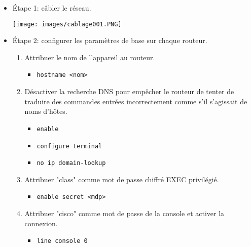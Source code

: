 \documentclass[a4paper]{article}
\begin{document}
\begin{itemize}





\item Étape 1: câbler le réseau.
\begin{center}
    \texttt{[image: images/cablage001.PNG]}
\end{center}





\item Étape 2: configurer les paramètres de base sur chaque routeur.
\begin{enumerate}
    \item Attribuer le nom de l'appareil au routeur.
    \begin{example}
        \begin{itemize}
            \item \texttt{hostname <nom>}
        \end{itemize}
    \end{example}
    \item Désactiver la recherche DNS pour empêcher le routeur de tenter de traduire des commandes entrées incorrectement comme s'il s'agissait de noms d'hôtes.
    \begin{example}
        \begin{itemize}
            \item \texttt{enable}
            \item \texttt{configure terminal}
            \item \texttt{no ip domain-lookup}
        \end{itemize}
    \end{example}
    \item Attribuer "class" comme mot de passe chiffré EXEC privilégié.
    \begin{example}
        \begin{itemize}
            \item \texttt{enable secret <mdp>}
        \end{itemize}
    \end{example}
    \item Attribuer "cisco" comme mot de passe de la console et activer la connexion.
    \begin{example}
        \begin{itemize}
            \item \texttt{line console 0}

\end{itemize}
\end{example}
\end{enumerate}
\end{itemize}
\end{document}
